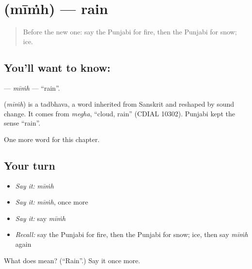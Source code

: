 \section[\texorpdfstring{\pa{ਮੀਂਹ} (mīṁh)}{ਮੀਂਹ (mīṁh)}]{ (mīṁh) — rain}

\label{lesson:PA-C76-mimh}



\begin{quote}
Before the new one: say the Punjabi for fire, then the Punjabi for snow; ice.
\end{quote}

\subsection*{You'll want to know: }
\textbf{} — \emph{mīṁh} — \textquotedblleft{}rain\textquotedblright{}.

\begin{cousinweb}
\textbf{} (\emph{mīṁh}) is a tadbhava, a word inherited from Sanskrit and reshaped by sound change. It comes from \emph{megha}, \textquotedblleft{}cloud, rain\textquotedblright{} (CDIAL 10302). Punjabi kept the sense \textquotedblleft{}rain\textquotedblright{}.
\end{cousinweb}

\begin{grammarlens}[title={What you've built}]
One more word for this chapter.
\end{grammarlens}

\subsection*{Your turn}
\begin{itemize}
\raggedright
  \item \emph{Say it:} \emph{mīṁh}
  \item \emph{Say it:} \emph{mīṁh}, once more
  \item \emph{Say it:} say \emph{mīṁh}
  \item \emph{Recall:} say the Punjabi for fire, then the Punjabi for snow; ice, then say \emph{mīṁh} again
\end{itemize}

\begin{tcolorbox}[breakable,colback=teal!4,colframe=teal!35!black,title={Before you move on}]
What does  mean? (\textquotedblleft{}Rain\textquotedblright{}.) Say it once more.
\end{tcolorbox}
